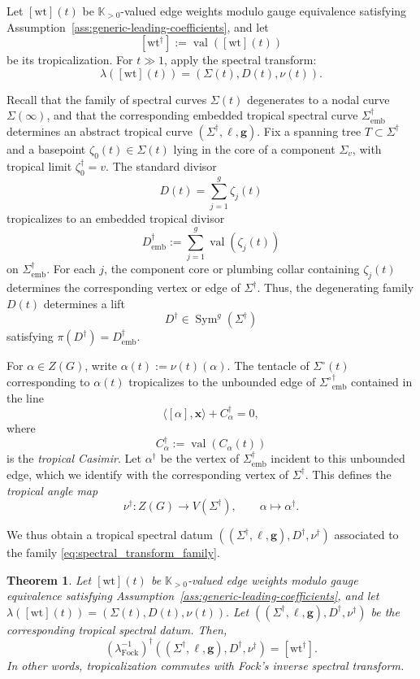\documentclass[12pt]{amsart}
\numberwithin{equation}{section}
\newtheorem{theorem}{Theorem}[section]
\theoremstyle{definition}
\newcommand{\R}{\mathbb{R}}
\def\vertices{V}
\newcommand{\wt}{\mathrm{wt}}
\newcommand{\val}{\operatorname{val}}
\def\divisor{D}
\def\casimir{C}
\def\Puis{\mathbb K}
\def\Puispos{\Puis_{>0}}
\def\val{\operatorname{val}}
\def\trop{\dagger}
\def\zzG{{{Z}(G)}}
\def\openspectralcurve{{\Sigma^{\circ}}}
\def\sym{\operatorname{Sym}}
\def\divisor{D}
\def\ptR{{\bm{x}}} %
\def\Ctr{C^\trop}
\def\divptgeom{\zeta}
\def\ptSig{\zeta}
\def\basept{{\ptSig_0}}
\def\baseptT{{\ptSig_0^\trop}}
\def\mcurve{\Sigma}
\def\tropmcurve{\mcurve^\trop}
\begin{document}
Let $[\wt](t)$ be $\Puispos$-valued edge weights modulo gauge
equivalence satisfying Assumption~\ref{ass:generic-leading-coefficients}, and let
\[
[\wt^\trop]:=\val([\wt](t))
\]
be its tropicalization. For $t\gg1$, apply the spectral transform:
\begin{equation}
\label{eq:spectral_transform_family}
\lambda([\wt](t))
=
(
\mcurve(t),\divisor(t),\nu(t)
).
\end{equation}

Recall that the family of spectral curves $\mcurve(t)$ degenerates to
a nodal curve $\mcurve(\infty)$, and that the corresponding embedded
tropical spectral curve $\tropmcurve_{\mathrm{emb}}$ determines an
abstract tropical curve
$
(\tropmcurve,\ell,\bm g).
$
Fix a spanning tree $T\subset\tropmcurve$ and a basepoint
$\basept(t)\in\mcurve(t)$ lying in the core of a component $\mcurve_v$,
with tropical limit $\baseptT=v$. The standard divisor
\[
\divisor(t)=\sum_{j=1}^g\divptgeom_j(t)
\]
tropicalizes to an embedded tropical divisor
\[
\divisor_{\mathrm{emb}}^\trop
:=
\sum_{j=1}^g \val(\divptgeom_j(t))
\]
on $\tropmcurve_{\mathrm{emb}}$. For each $j$, the component core or
plumbing collar containing $\divptgeom_j(t)$ determines the
corresponding vertex or edge of $\tropmcurve$. Thus, the degenerating
family $\divisor(t)$ determines a lift
\[
\divisor^\trop\in\sym^g(\tropmcurve)
\]
satisfying
$
\pi(\divisor^\trop)=\divisor_{\mathrm{emb}}^\trop.
$

For $\alpha\in\zzG$, write
$
\alpha(t):=\nu(t)(\alpha).
$
The tentacle of $\openspectralcurve(t)$ corresponding to
$\alpha(t)$ tropicalizes to the unbounded edge of
$\openspectralcurve^\trop_{\mathrm{emb}}$ contained in the line
\[
\langle[\alpha],\ptR\rangle+\Ctr_\alpha=0,
\]
where
\[
\Ctr_\alpha:=\val(\casimir_\alpha(t))
\]
is the \emph{tropical Casimir}. Let $\alpha^\trop$ be the vertex of
$\tropmcurve_{\mathrm{emb}}$ incident to this unbounded edge, which we
identify with the corresponding vertex of $\tropmcurve$. This defines
the \emph{tropical angle map}
\[
\nu^\trop:\zzG\rightarrow\vertices(\tropmcurve),
\qquad
\alpha\mapsto\alpha^\trop.
\]

We thus obtain a tropical spectral datum
$(
(\tropmcurve,\ell,\bm g),
\divisor^\trop,
\nu^\trop)
$ associated to the family
\eqref{eq:spectral_transform_family}.



\begin{theorem}
\label{thm:fock_weight_tropicalization}
Let $[\wt](t)$ be $\Puispos$-valued edge weights modulo gauge
equivalence satisfying Assumption~\ref{ass:generic-leading-coefficients}, and let
$
\lambda([\wt](t))
=
(
\mcurve(t),\divisor(t),\nu(t)
).
$
Let
$
(
(\tropmcurve,\ell,\bm g),
\divisor^\trop,
\nu^\trop
)
$
be the corresponding tropical spectral datum. Then,
\[
(\lambda^{-1}_{\mathrm{Fock}})^\trop
(
(\tropmcurve,\ell,\bm g),
\divisor^\trop,
\nu^\trop
)
=
[\wt^\trop].
\]
In other words, tropicalization commutes with Fock's inverse spectral
transform.
\end{theorem}
\end{document}
